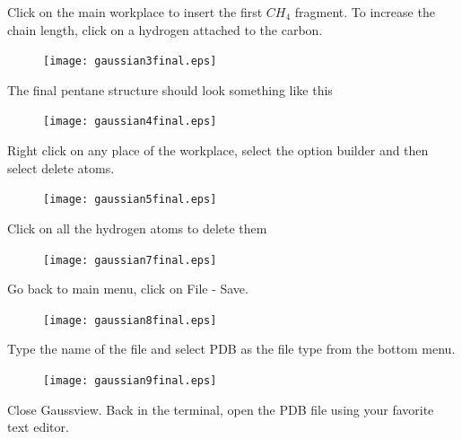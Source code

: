 Click on the main workplace to insert the first $CH_4$ fragment.
To increase the chain length, click on a hydrogen attached to the carbon. 

\begin{figure}[h]
\begin{center}
\texttt{[image: gaussian3final.eps]}
\end{center}
\end{figure}

The final pentane structure should look something like this

\begin{figure}[h]
\begin{center}
\texttt{[image: gaussian4final.eps]}
\end{center}
\end{figure}
\vspace{3in}
Right click on any place of the workplace, select the option builder and then
select delete atoms.

\begin{figure}[h]
\begin{center}
\texttt{[image: gaussian5final.eps]}
\end{center}
\end{figure}

Click on all the hydrogen atoms to delete them 

\begin{figure}[h]
\begin{center}
\texttt{[image: gaussian7final.eps]}
\end{center}
\end{figure}

\vspace{3in}
Go back to main menu, click on File - Save.

\begin{figure}[h]
\begin{center}
\texttt{[image: gaussian8final.eps]}
\end{center}
\end{figure}

Type the name of the file and select PDB as the file type from the bottom menu.

\begin{figure}[h]
\begin{center}
\texttt{[image: gaussian9final.eps]}
\end{center}
\end{figure}

\vspace{3in}
Close Gaussview. Back in the terminal, open the PDB file using your favorite text editor.

